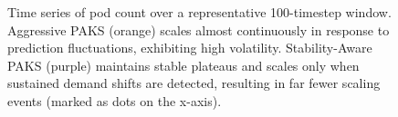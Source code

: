 \begin{figure}[htbp]
\begin{tikzpicture}[scale=1.0]
\end{tikzpicture}
\caption{Time series of pod count over a representative 100-timestep window. Aggressive PAKS (orange) scales almost continuously in response to prediction fluctuations, exhibiting high volatility. Stability-Aware PAKS (purple) maintains stable plateaus and scales only when sustained demand shifts are detected, resulting in far fewer scaling events (marked as dots on the x-axis).}
\label{fig:scaling_events_timeseries}
\end{figure}
